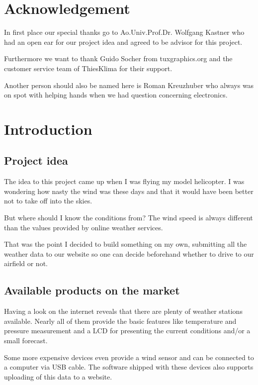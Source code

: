 
\chapter*{Acknowledgement}

In first place our special thanks go to Ao.Univ.Prof.Dr. Wolfgang Kastner who had an open ear for our project idea and agreed to be advisor for this project.

Furthermore we want to thank Guido Socher from tuxgraphics.org and the customer service team of ThiesKlima for their support.

Another person should also be named here is Roman Kreuzhuber who always was on spot with helping hands when we had question concerning electronics. 

\chapter{Introduction}

\section{Project idea}
The idea to this project came up when I was flying my model helicopter. I was wondering how nasty the wind was these days and that it would have been better not to take off into the skies.

But where should I know the conditions from? The wind speed is always different than the values provided by online weather services.

That was the point I decided to build something on my own, submitting all the weather data to our website so one can decide beforehand whether to drive to our airfield or not.

\section{Available products on the market}
Having a look on the internet reveals that there are plenty of weather stations available. Nearly all of them provide the basic features like temperature and pressure measurement and a LCD for presenting the current conditions and/or a small forecast.

Some more expensive devices even provide a wind sensor and can be connected to a computer via USB cable. The software shipped with these devices also supports uploading of this data to a website.

